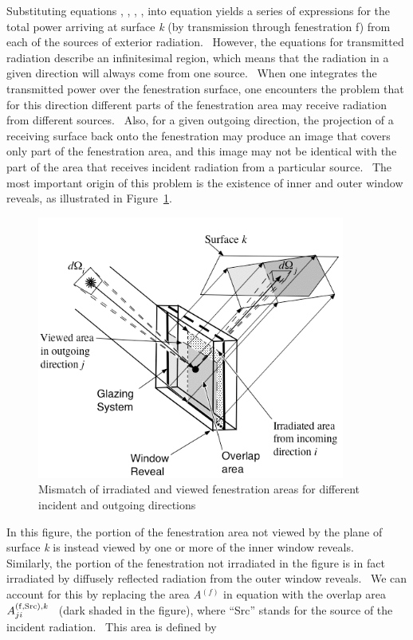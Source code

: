 Substituting equations , , , , into equation yields a series of expressions for the total power arriving at surface \emph{k} (by transmission through fenestration f) from each of the sources of exterior radiation.~ However, the equations for transmitted radiation describe an infinitesimal region, which means that the radiation in a given direction will always come from one source.~ When one integrates the transmitted power over the fenestration surface, one encounters the problem that for this direction different parts of the fenestration area may receive radiation from different sources.~ Also, for a given outgoing direction, the projection of a receiving surface back onto the fenestration may produce an image that covers only part of the fenestration area, and this image may not be identical with the part of the area that receives incident radiation from a particular source.~ The most important origin of this problem is the existence of inner and outer window reveals, as illustrated in Figure~\ref{fig:mismatch-of-irradiated-and-viewed}.

\begin{figure}[hbtp] %
\centering
\includegraphics[width=0.9\textwidth, height=0.9\textheight, keepaspectratio=true]{media/image1392.png}
\caption{Mismatch of irradiated and viewed fenestration areas for different incident and outgoing directions \protect \label{fig:mismatch-of-irradiated-and-viewed}}
\end{figure}

In this figure, the portion of the fenestration area not viewed by the plane of surface \emph{k} is instead viewed by one or more of the inner window reveals.~ Similarly, the portion of the fenestration not irradiated in the figure is in fact irradiated by diffusely reflected radiation from the outer window reveals.~ We can account for this by replacing the area \emph{A}\(^{(f)}\) in equation with the overlap area \(A_{ji}^{{\rm{(f, Src), }}k}\) \emph{~}(dark shaded in the figure), where ``Src'' stands for the source of the incident radiation.~ This area is defined by

